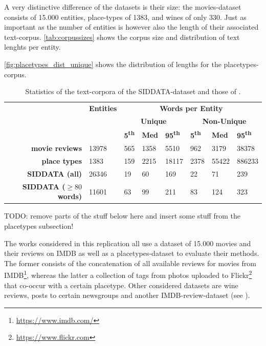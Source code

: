A very distinctive difference of the datasets is their size: the movies-dataset consists of 15.000 entities, place-types of 1383, and wines of only 330. Just as important as the number of entities is however also the length of their associated text-corpus. \autoref{tab:corpussizes} shows the corpus size and distribution of text lenghts per entity.

\autoref{fig:placetypes_dist_unique} shows the distribution of lengths for the placetypes-corpus.


\begin{table}[]
	\centering
	\begin{tabular}{r|l|lll|lll}
		&  \textbf{Entities}   & \multicolumn{6}{c}{\textbf{Words per Entity}}                                 \\
		&       & \multicolumn{3}{c}{\textbf{Unique}} & \multicolumn{3}{c}{\textbf{Non-Unique}} \\
	 &  & \textbf{5\textsuperscript{th}} & \textbf{Med} & \textbf{95\textsuperscript{th}} & \textbf{5\textsuperscript{th}} & \textbf{Med} & \textbf{95\textsuperscript{th}} \\ \midrule
	\textbf{movie reviews}                                                          & 13978 & 565       & 1358       & 5510       & 962        & 3179        & 38378        \\
	\textbf{place types}                                                          & 1383  & 159       & 2215       & 18117      & 2378       & 55422       & 886233       \\
	\textbf{SIDDATA (all)}     & 26346 & 19        & 60         & 169        & 22         & 71          & 239          \\
	\textbf{SIDDATA ($\geq 80$ words)} & 11601 & 63        & 99         & 211        & 83         & 124         & 323         
	\end{tabular}
	\caption{Statistics of the text-corpora of the SIDDATA-dataset and those of \cite{Derrac2015}.}
	\label{tab:corpussizes}
	\end{table}


TODO: remove parts of the stuff below here and insert some stuff from the placetypes subsection!


The works considered in this replication \mainalgos all use a dataset of 15.000 movies and their reviews on IMDB as well as a placetypes-dataset to evaluate their methods. The former consists of the concatenation of all available reviews for movies from IMDB\footnote{\url{https://www.imdb.com/}}, whereas the latter a collection of tags from photos uploaded to Flickr\footnote{\url{https://www.flickr.com}} that co-occur with a certain placetype. Other considered datasets are wine reviews, posts to certain newsgroups and another IMDB-review-dataset (see ). 

